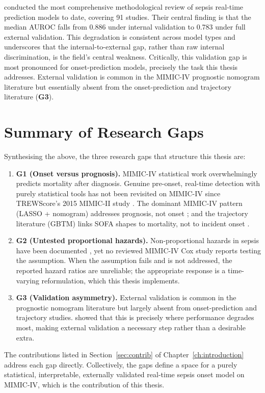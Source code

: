 \textcite{wang2025srpm} conducted the most comprehensive
methodological review of sepsis real-time prediction models to date, covering
91 studies. Their central finding is that the median AUROC falls from 0.886
under internal validation to 0.783 under full external validation. This
degradation is consistent across model types and underscores that the
internal-to-external gap, rather than raw internal discrimination, is the
field's central weakness. Critically, this validation gap is most pronounced
for onset-prediction models, precisely the task this thesis addresses.
External validation is common in the MIMIC-IV prognostic nomogram literature
but essentially absent from the onset-prediction and trajectory literature
(\textbf{G3}).

\section{Summary of Research Gaps}
\label{sec:gap_summary}

Synthesising the above, the three research gaps that structure this thesis are:

\begin{enumerate}
  \item \textbf{G1 (Onset versus prognosis).} MIMIC-IV statistical work
  overwhelmingly predicts mortality after diagnosis. Genuine pre-onset,
  real-time detection with purely statistical tools has not been revisited on
  MIMIC-IV since TREWScore's 2015 MIMIC-II study \cite{henry2015trewscore}.
  The dominant MIMIC-IV pattern (LASSO + nomogram) addresses prognosis, not
  onset \cite{yuan2023nomogram}; and the trajectory literature (GBTM) links
  SOFA shapes to mortality, not to incident onset \cite{yang2022gbtm}.

  \item \textbf{G2 (Untested proportional hazards).} Non-proportional hazards
  in sepsis have been documented \cite{kasal2004cox}, yet no reviewed MIMIC-IV
  Cox study reports testing the assumption. When the assumption fails and is
  not addressed, the reported hazard ratios are unreliable; the appropriate
  response is a time-varying reformulation, which this thesis implements.

  \item \textbf{G3 (Validation asymmetry).} External validation is common in
  the prognostic nomogram literature \cite{yuan2023nomogram} but largely absent
  from onset-prediction and trajectory studies.
  \textcite{wang2025srpm} showed that this is precisely where performance degrades
  most, making external validation a necessary step rather than a desirable
  extra.
\end{enumerate}

The contributions listed in Section~\ref{sec:contrib} of
Chapter~\ref{ch:introduction} address each gap directly. Collectively, the
gaps define a space for a purely statistical, interpretable, externally validated
real-time sepsis onset model on MIMIC-IV, which is the contribution of this
thesis.
